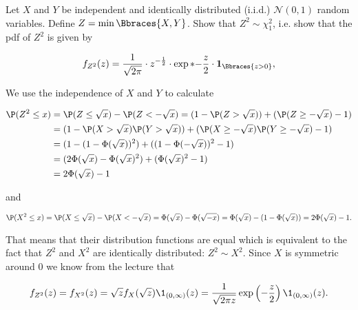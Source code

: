 
\begin{exercise}

Let $X$ and $Y$ be independent and identically distributed (i.i.d.) $\mathcal N(0, 1)$ random variables.
Define $Z = \min \Bbraces{X, Y}$.
Show that $Z^2 \sim \chi_1^2$, i.e. show that the pdf of $Z^2$ is given by

\begin{align*}
    f_{Z^2}(z)
    =
    \frac{1}{\sqrt{2 \pi}} \cdot z^{-\frac{1}{2}} \cdot \exp*{-\frac{z}{2}} \cdot \mathbf 1_\Bbraces{z > 0},
\end{align*}

\end{exercise}


\begin{solution}

We use the independence of $X$ and $Y$ to calculate

\begin{align*}
  \P(Z^2 \leq x) &= \P(Z \leq \sqrt{x}) - \P(Z < -\sqrt{x})
  = (1 - \P(Z > \sqrt{x})) + (\P(Z \geq -\sqrt{x}) - 1) \\
  &= (1 - \P(X > \sqrt{x})\P(Y > \sqrt{x})) + (\P(X \geq - \sqrt{x})\P(Y \geq - \sqrt{x}) - 1) \\
  &= (1 - (1 - \Phi(\sqrt{x}))^2) + ((1 - \Phi(-\sqrt{x}))^2-1) \\
  &=  (2\Phi(\sqrt{x}) - \Phi(\sqrt{x})^2 ) + (\Phi(\sqrt{x})^2-1) \\
  &= 2\Phi(\sqrt{x}) - 1
\end{align*}

and

\begin{align*}
  \P(X^2 \leq x) = \P(X \leq \sqrt{x}) - \P(X < -\sqrt{x}) = \Phi(\sqrt{x}) - \Phi(\sqrt{-x})
  = \Phi(\sqrt{x}) - (1 - \Phi(\sqrt{x})) = 2\Phi(\sqrt{x}) - 1.
\end{align*}

That means that their distribution functions are equal which is equivalent
to the fact that $Z^2$ and $X^2$ are identically distributed: $Z^2 \sim X^2$.
Since $X$ is symmetric around 0 we know from the lecture that

\begin{align*}
  f_{Z^2}(z) = f_{X^2}(z) = \sqrt{z}f_X(\sqrt{z})\1_{(0,\infty)}(z) = \frac{1}{\sqrt{2\pi z}}\exp\left(-\frac{z}{2}\right)\1_{(0,\infty)}(z).
\end{align*}

\end{solution}


